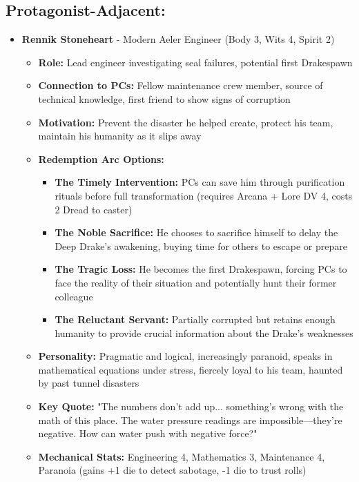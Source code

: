 \documentclass[11pt]{article}
\begin{document}
\subsection{Protagonist-Adjacent:}
\begin{itemize}
\item \textbf{Rennik Stoneheart} - Modern Aeler Engineer (Body 3, Wits 4, Spirit 2)
  \begin{itemize}
  \item \textbf{Role:} Lead engineer investigating seal failures, potential first Drakespawn
  \item \textbf{Connection to PCs:} Fellow maintenance crew member, source of technical knowledge, first friend to show signs of corruption
  \item \textbf{Motivation:} Prevent the disaster he helped create, protect his team, maintain his humanity as it slips away
  \item \textbf{Redemption Arc Options:}
    \begin{itemize}
    \item \textbf{The Timely Intervention:} PCs can save him through purification rituals before full transformation (requires Arcana + Lore DV 4, costs 2 Dread to caster)
    \item \textbf{The Noble Sacrifice:} He chooses to sacrifice himself to delay the Deep Drake's awakening, buying time for others to escape or prepare
    \item \textbf{The Tragic Loss:} He becomes the first Drakespawn, forcing PCs to face the reality of their situation and potentially hunt their former colleague
    \item \textbf{The Reluctant Servant:} Partially corrupted but retains enough humanity to provide crucial information about the Drake's weaknesses
    \end{itemize}
  \item \textbf{Personality:} Pragmatic and logical, increasingly paranoid, speaks in mathematical equations under stress, fiercely loyal to his team, haunted by past tunnel disasters
  \item \textbf{Key Quote:} "The numbers don't add up... something's wrong with the math of this place. The water pressure readings are impossible—they're negative. How can water push with negative force?"
  \item \textbf{Mechanical Stats:} Engineering 4, Mathematics 3, Maintenance 4, Paranoia (gains +1 die to detect sabotage, -1 die to trust rolls)
  \end{itemize}

\end{itemize}
\end{document}
